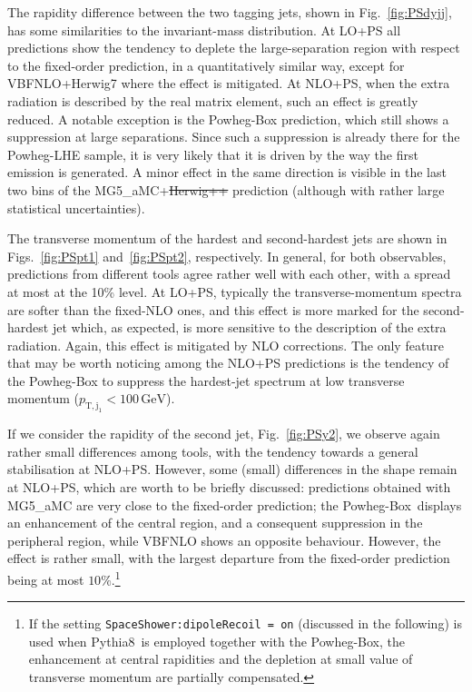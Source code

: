 \documentclass[twocolumn,epjc3]{svjour3} %
\newcommand{\Pj}{\ensuremath{\text{j}}\xspace}
\newcommand{\GeV}{\ensuremath{\,\text{GeV}}\xspace}
\newcommand{\ptsub}[1]{\ensuremath{p_{\text{T},#1}}\xspace}
\providecommand{\DIFaddtex}[1]{{\protect\color{blue}\uwave{#1}}} %
\providecommand{\DIFdeltex}[1]{{\protect\color{red}\sout{#1}}}                      %
\providecommand{\DIFaddbegin}{} %
\providecommand{\DIFaddend}{} %
\providecommand{\DIFdelbegin}{} %
\providecommand{\DIFdelend}{} %
\providecommand{\DIFadd}[1]{\texorpdfstring{\DIFaddtex{#1}}{#1}} %
\providecommand{\DIFdel}[1]{\texorpdfstring{\DIFdeltex{#1}}{}} %
\begin{document}
The rapidity difference between the two tagging jets, shown in Fig.~\ref{fig:PSdyjj}, has some similarities to the invariant-mass distribution.
At LO+PS all predictions show the tendency to deplete the large-separation region with respect to the fixed-order prediction, in a
quantitatively similar way,
except for {\sc VBFNLO+Herwig7} where the effect is mitigated. At 
NLO+PS, when the extra radiation is described by the real matrix element, such an effect is greatly reduced. A notable
exception is the {\sc Powheg-Box} prediction, which still shows a suppression at large separations.
Since such a suppression is already there for the {\sc Powheg-LHE} sample,
it is very likely that it is driven by the way the first emission is generated. A minor effect in the same direction is visible in the last two bins of the
{\sc MG5\_aMC+\DIFdelbegin \DIFdel{Herwig++}\DIFdelend \DIFaddbegin \DIFadd{Herwig7}\DIFaddend } prediction (although with rather large statistical uncertainties).



The transverse momentum of the hardest and second-hardest jets are shown in Figs.~\ref{fig:PSpt1} and~\ref{fig:PSpt2}, respectively. In general, for both observables,
predictions from different tools agree rather well with each other, with a spread at most at the 10\% level. At LO+PS, typically the transverse-momentum spectra are softer than
the fixed-NLO ones, and this effect is more marked for the second-hardest jet which, as expected, is more sensitive to the description of the extra radiation. Again, this
effect is mitigated by NLO corrections. The only feature that may be worth noticing among the NLO+PS predictions is the tendency of the {\sc Powheg-Box} to suppress the
hardest-jet spectrum at low transverse momentum ($\ptsub{\Pj_1}<100 \GeV$).

If we consider the rapidity of the second jet, Fig.~\ref{fig:PSy2}, we observe again rather small differences among tools, with the tendency towards a general
stabilisation at NLO+PS. However, some (small) differences in the shape remain at NLO+PS, which are worth to be briefly discussed: predictions
obtained with {\sc MG5\_aMC} are very close to the fixed-order prediction; the {\sc Powheg-Box}\ displays an enhancement of the central region, and a consequent suppression in the
peripheral region, while {\sc VBFNLO} shows an opposite behaviour. However, the effect is rather small, with the largest departure from the fixed-order prediction being
at most $10\%$.\footnote{If the setting {\tt SpaceShower:dipole\-Recoil = on} (discussed in the following)
is used when {\sc Pythia8}\ is employed together with the {\sc Powheg-Box}, the enhancement at central rapidities and the depletion
at small value of transverse momentum are partially compensated.}
\end{document}
